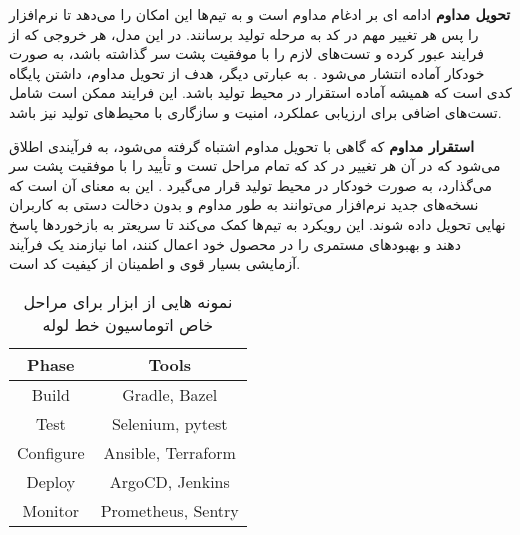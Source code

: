 \textbf{تحویل مداوم}
 ادامه ای بر ادغام مداوم است و به تیم‌ها این امکان را می‌دهد تا نرم‌افزار را پس هر تغییر مهم در کد به مرحله تولید برسانند. در این مدل، هر خروجی که از فرایند  عبور کرده و تست‌های لازم را با موفقیت پشت سر گذاشته باشد، به صورت خودکار آماده انتشار می‌شود \cite{DevopsCICD2}. به عبارتی دیگر، هدف از تحویل مداوم، داشتن پایگاه کدی است که همیشه آماده استقرار در محیط تولید باشد. این فرایند ممکن است شامل تست‌های اضافی برای ارزیابی عملکرد، امنیت و سازگاری با محیط‌های تولید نیز باشد. 

\textbf{استقرار مداوم}
 که گاهی با تحویل مداوم اشتباه گرفته می‌شود، به فرآیندی اطلاق می‌شود که در آن هر تغییر در کد که تمام مراحل تست و تأیید را با موفقیت پشت سر می‌گذارد، به صورت خودکار در محیط تولید قرار می‌گیرد \cite{DevopsCICD2}. این به معنای آن است که نسخه‌های جدید نرم‌افزار می‌توانند به طور مداوم و بدون دخالت دستی به کاربران نهایی تحویل داده شوند. این رویکرد به تیم‌ها کمک می‌کند تا سریعتر به بازخوردها پاسخ دهند و بهبودهای مستمری را در محصول خود اعمال کنند، اما نیازمند یک فرآیند آزمایشی بسیار قوی و اطمینان از کیفیت کد است.
\begin{table}
	\centering
	\caption{نمونه هایی از ابزار برای مراحل خاص اتوماسیون خط لوله }
	\label{tb: ci/cd tools}
	\begin{tabular}{|c|c|}
		\hline
		Phase     & Tools            \\ \hline
		Build     & Gradle, Bazel      \\ \hline
		Test      & Selenium, pytest   \\ \hline
		Configure & Ansible, Terraform \\ \hline
		Deploy    & ArgoCD, Jenkins    \\ \hline
		Monitor   & Prometheus, Sentry \\ \hline
	\end{tabular}
\end{table}


